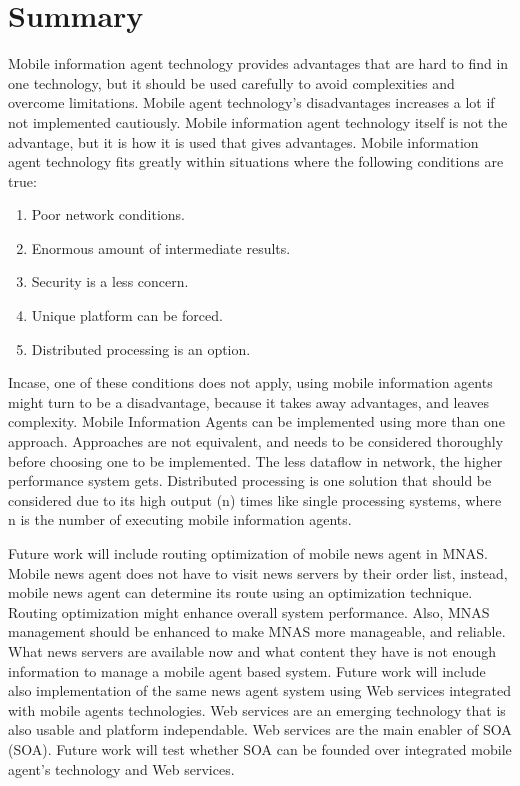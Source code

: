 \documentclass[12pt,a4paper,final,twoside,onecolumn,titlepage]{book}
\begin{document}
\section{Summary}
Mobile information agent technology provides advantages that are hard to find in one technology, but it should be used carefully to avoid complexities and overcome limitations. Mobile agent technology's disadvantages increases a lot if not implemented cautiously. Mobile information agent technology itself is not the advantage, but it is how it is used that gives advantages. Mobile information agent technology fits greatly within situations where the following conditions are true:
\begin{enumerate}
\item Poor network conditions.
\item Enormous amount of intermediate results.
\item Security is a less concern.
\item Unique platform can be forced.
\item Distributed processing is an option.
\end{enumerate}

Incase, one of these conditions does not apply, using mobile information agents might turn to be a disadvantage, because it takes away advantages, and leaves complexity. Mobile Information Agents can be implemented using more than one approach. Approaches are not equivalent, and needs to be considered thoroughly before choosing one to be implemented. The less dataflow in network, the higher performance system gets. Distributed processing is one solution that should be considered due to its high output (n) times like single processing systems, where n is the number of executing mobile information agents.

Future work will include routing optimization of mobile news agent in \gls{MNAS}. Mobile news agent does not have to visit news servers by their order list, instead, mobile news agent can determine its route using an optimization technique. Routing optimization might enhance overall system performance. Also, \gls{MNAS} management should be enhanced to make \gls{MNAS} more manageable, and reliable. What news servers are available now and what content they have is not enough information to manage a mobile agent based system. Future work will include also implementation of the same news agent system using Web services integrated with mobile agents technologies. Web services are an emerging technology that is also usable and platform independable. Web services are the main enabler of \gls{SOA} (\gls{SOA}). Future work will test whether \gls{SOA} can be founded over integrated mobile agent's technology and Web services.
\end{document}
